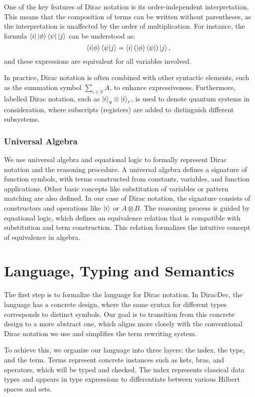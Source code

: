 \documentclass[runningheads]{llncs}
\begin{document}
One of the key features of Dirac notation is its order-independent interpretation. This means that the composition of terms can be written without parentheses, as the interpretation is unaffected by the order of multiplication. For instance, the formula \( \bra{i}\ket{\phi}\bra{\psi}\ket{j} \) can be understood as:
\[
    \braket{i|\phi}\braket{\psi|j} = \bra{i} (\ket{\phi}\bra{\psi}) \ket{j},
\]
and these expressions are equivalent for all variables involved.

In practice, Dirac notation is often combined with other syntactic elements, such as the summation symbol \( \sum_{i \in S} A \), to enhance expressiveness. Furthermore, labelled Dirac notation, such as \( \ket{i}_q \otimes \ket{i}_r \), is used to denote quantum systems in consideration, where subscripts (registers) are added to distinguish different subsystems.

\subsubsection{Universal Algebra}
We use universal algebra and equational logic to formally represent Dirac notation and the reasoning procedure. A universal algebra defines a signature of function symbols, with terms constructed from constants, variables, and function applications. 
Other basic concepts like substitution of variables or pattern matching are also defined.
In our case of Dirac notation, the signature consists of constructors and operations like $\ket{i}$ or $A \otimes B$.
The reasoning process is guided by equational logic, which defines an equivalence relation that is compatible with substitution and term construction. This relation formalizes the intuitive concept of equivalence in algebra.



\section{Language, Typing and Semantics}
The first step is to formalize the language for Dirac notation. In DiracDec, the language has a concrete design, where the same syntax for different types corresponds to distinct symbols. Our goal is to transition from this concrete design to a more abstract one, which aligns more closely with the conventional Dirac notation we use and simplifies the term rewriting system.

To achieve this, we organize our language into three layers: the index, the type, and the term. Terms represent concrete instances such as kets, bras, and operators, which will be typed and checked. The index represents classical data types and appears in type expressions to differentiate between various Hilbert spaces and sets.
\end{document}
